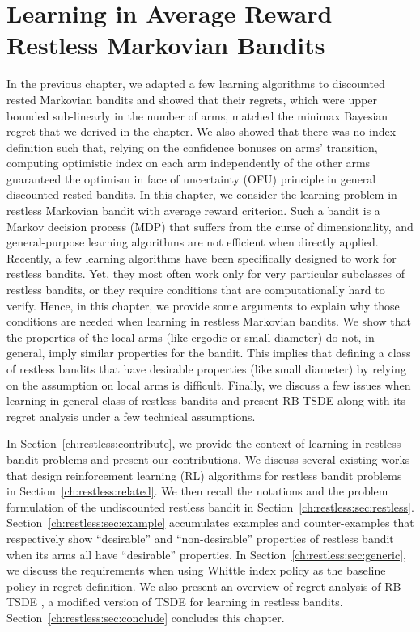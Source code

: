 \begingroup

\let\clearpage\relax

\chapter{Learning in Average Reward Restless Markovian Bandits}
\label{ch:learning_restless}

In the previous chapter, we adapted a few learning algorithms to discounted rested Markovian bandits and showed that their regrets, which were upper bounded sub-linearly in the number of arms, matched the minimax Bayesian regret that we derived in the chapter.
We also showed that there was no index definition such that, relying on the confidence bonuses on arms' transition, computing optimistic index on each arm independently of the other arms guaranteed the optimism in face of uncertainty (OFU) principle in general discounted rested bandits.
In this chapter, we consider the learning problem in restless Markovian bandit with average reward criterion.
Such a bandit is a Markov decision process (MDP) that suffers from the curse of dimensionality, and general-purpose learning algorithms are not efficient when directly applied. Recently, a few learning algorithms have been specifically designed to work for restless bandits. Yet, they most often work only for very particular subclasses of restless bandits, or they require conditions that are computationally hard to verify.
Hence, in this chapter, we provide some arguments to explain why those conditions are needed when learning in restless Markovian bandits. We show that the properties of the local arms (like ergodic or small diameter) do not, in general, imply similar properties for the bandit. This implies that defining a class of restless bandits that have desirable properties (like small diameter) by relying on the assumption on local arms is difficult. 
Finally, we discuss a few issues when learning in general class of restless bandits and present RB-TSDE \cite{akbarzadeh2022learning} along with its regret analysis under a few technical assumptions.

In Section~\ref{ch:restless:contribute}, we provide the context of learning in restless bandit problems and present our contributions.
We discuss several existing works that design reinforcement learning (RL) algorithms for restless bandit problems in Section~\ref{ch:restless:related}.
We then recall the notations and the problem formulation of the undiscounted restless bandit in Section~\ref{ch:restless:sec:restless}.
Section~\ref{ch:restless:sec:example} accumulates examples and counter-examples that respectively show ``desirable'' and ``non-desirable'' properties of restless bandit when its arms all have ``desirable'' properties.
In Section~\ref{ch:restless:sec:generic}, we discuss the requirements when using Whittle index policy as the baseline policy in regret definition.
We also present an overview of regret analysis of RB-TSDE \cite{akbarzadeh2022learning}, a modified version of TSDE \cite{ouyang2017learning} for learning in restless bandits.
Section~\ref{ch:restless:sec:conclude} concludes this chapter.

